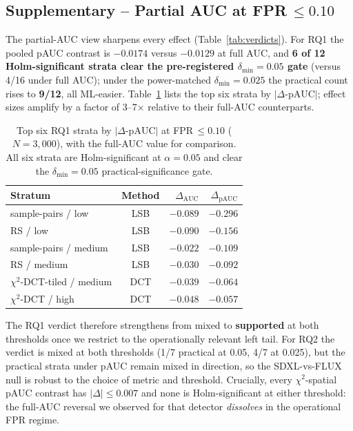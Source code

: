 \documentclass[10pt,twocolumn,a4paper]{article}
\begin{document}
\subsection{Supplementary -- Partial AUC at FPR\,$\leq\!0.10$}

The partial-AUC view sharpens every effect (Table~\ref{tab:verdicts}). For RQ1 the pooled pAUC contrast is $-0.0174$ versus $-0.0129$ at full AUC, and \textbf{6 of 12 Holm-significant strata clear the pre-registered $\delta_\text{min}\!=\!0.05$ gate} (versus 4/16 under full AUC); under the power-matched $\delta_\text{min}\!=\!0.025$ the practical count rises to \textbf{9/12}, all ML-easier. Table~\ref{tab:pauc-top} lists the top six strata by $|\Delta\text{-pAUC}|$; effect sizes amplify by a factor of 3--7$\times$ relative to their full-AUC counterparts.

\begin{table}[t]
\centering\small
\caption{Top six RQ1 strata by $|\Delta\text{-pAUC}|$ at FPR\,$\leq\!0.10$ ($N\!=\!3{,}000$), with the full-AUC value for comparison. All six strata are Holm-significant at $\alpha\!=\!0.05$ and clear the $\delta_\text{min}\!=\!0.05$ practical-significance gate.}
\label{tab:pauc-top}
\setlength{\tabcolsep}{5pt}\renewcommand{\arraystretch}{1.1}
\begin{tabular}{@{}l c r r@{}}
\toprule
\textbf{Stratum} & \textbf{Method} & \textbf{$\Delta_\text{AUC}$} & \textbf{$\Delta_\text{pAUC}$} \\
\midrule
sample-pairs / low    & LSB & $-0.089$ & $\boldsymbol{-0.296}$ \\
RS / low              & LSB & $-0.090$ & $-0.156$ \\
sample-pairs / medium & LSB & $-0.022$ & $-0.109$ \\
RS / medium           & LSB & $-0.030$ & $-0.092$ \\
$\chi^2$-DCT-tiled / medium & DCT & $-0.039$ & $-0.064$ \\
$\chi^2$-DCT / high   & DCT & $-0.048$ & $-0.057$ \\
\bottomrule
\end{tabular}
\end{table}

The RQ1 verdict therefore strengthens from mixed to \textbf{supported} at both thresholds once we restrict to the operationally relevant left tail. For RQ2 the verdict is mixed at both thresholds (1/7 practical at 0.05, 4/7 at 0.025), but the practical strata under pAUC remain mixed in direction, so the SDXL-vs-FLUX null is robust to the choice of metric and threshold. Crucially, every $\chi^2$-spatial pAUC contrast has $|\Delta|\!\leq\!0.007$ and none is Holm-significant at either threshold: the full-AUC reversal we observed for that detector \emph{dissolves} in the operational FPR regime.
\end{document}

